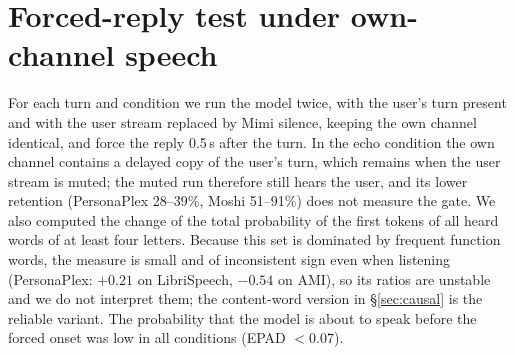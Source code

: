 \documentclass[11pt,a4paper]{article}
\newcommand{\PP}{PersonaPlex}
\begin{document}
\section{Forced-reply test under own-channel speech}
\label{app:v8}
For each turn and condition we run the model twice, with the user's turn present and with the user stream replaced by Mimi silence, keeping the own channel identical, and force the reply 0.5\,s after the turn.
In the echo condition the own channel contains a delayed copy of the user's turn, which remains when the user stream is muted; the muted run therefore still hears the user, and its lower retention (\PP{} 28--39\%, Moshi 51--91\%) does not measure the gate.
We also computed the change of the total probability of the first tokens of all heard words of at least four letters.
Because this set is dominated by frequent function words, the measure is small and of inconsistent sign even when listening (\PP{}: $+0.21$ on LibriSpeech, $-0.54$ on AMI), so its ratios are unstable and we do not interpret them; the content-word version in \S\ref{sec:causal} is the reliable variant.
The probability that the model is about to speak before the forced onset was low in all conditions (EPAD $<0.07$).
\end{document}
